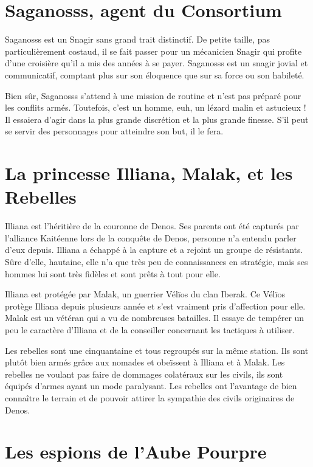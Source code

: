 \begin{multicols}{2}

\section{Saganosss, agent du Consortium}

Saganosss est un Snagir sans grand trait distinctif. De petite taille, pas particulièrement costaud, il se fait passer pour un mécanicien Snagir qui profite d'une croisière qu'il a mis des années à se payer. Saganosss est un snagir jovial et communicatif, comptant plus sur son éloquence que sur sa force ou son habileté.

Bien sûr, Saganosss s'attend à une mission de routine et n'est pas préparé pour les conflits armés. Toutefois, c'est un homme, euh, un lézard malin et astucieux ! Il essaiera d'agir dans la plus grande discrétion et la plus grande finesse. S'il peut se servir des personnages pour atteindre son but, il le fera.

\section{La princesse Illiana, Malak, et les Rebelles}

Illiana est l'héritière de la couronne de Denos. Ses parents ont été capturés par l'alliance Kaitéenne lors de la conquête de Denos, personne n'a entendu parler d'eux depuis. Illiana a échappé à la capture et a rejoint un groupe de résistants. Sûre d'elle, hautaine, elle n'a que très peu de connaissances en stratégie, mais ses hommes lui sont très fidèles et sont prêts à tout pour elle.

Illiana est protégée par Malak, un guerrier Vélïos du clan Iberak. Ce Vélïos protège Illiana depuis plusieurs année et s'est vraiment pris d'affection pour elle. Malak est un vétéran qui a vu de nombreuses batailles. Il essaye de tempérer un peu le caractère d'Illiana et de la conseiller concernant les tactiques à utiliser.

Les rebelles sont une cinquantaine et tous regroupés sur la même station. Ils sont plutôt bien armés grâce aux nomades et obeïssent à Illiana et à Malak. Les rebelles ne voulant pas faire de dommages colatéraux sur les civils, ils sont équipés d'armes ayant un mode paralysant. Les rebelles ont l'avantage de bien connaître le terrain et de pouvoir attirer la sympathie des civils originaires de Denos.

\section{Les espions de l'Aube Pourpre}


\end{multicols}
